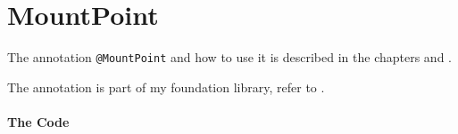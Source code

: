 \section{MountPoint}\label{code:MountPoint}
The annotation \lstinline|@MountPoint| and how to use it is described in the chapters  and .

The annotation is part of my foundation library, refer to \autocite{TQUADRAT_ORG_FOUNDATION_MOUNTPOINT}.


\paragraph{The Code}\




